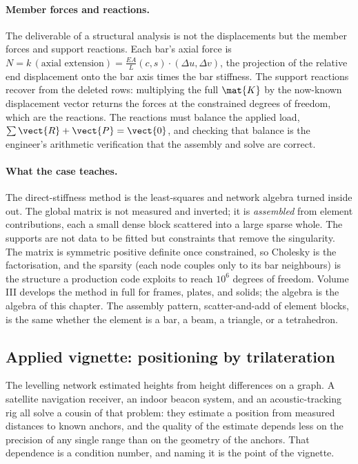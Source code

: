 \paragraph{Member forces and reactions.}
The deliverable of a structural analysis is not the displacements but
the member forces and support reactions. Each bar's axial force is
$N = k\,(\text{axial extension}) = \tfrac{EA}{L}(c, s) \cdot
(\Delta u, \Delta v)$, the projection of the relative end displacement
onto the bar axis times the bar stiffness. The support reactions
recover from the deleted rows: multiplying the full $\mat{K}$ by the
now-known displacement vector returns the forces at the constrained
degrees of freedom, which are the reactions. The reactions must
balance the applied load, $\sum \vect{R} + \vect{P} = \vect{0}$, and
checking that balance is the engineer's arithmetic verification that
the assembly and solve are correct.

\paragraph{What the case teaches.}
The direct-stiffness method is the least-squares and network algebra
turned inside out. The global matrix is not measured and inverted; it
is \emph{assembled} from element contributions, each a small dense
block scattered into a large sparse whole. The supports are not data
to be fitted but constraints that remove the singularity. The matrix
is symmetric positive definite once constrained, so Cholesky is the
factorisation, and the sparsity (each node couples only to its bar
neighbours) is the structure a production code exploits to reach
$10^{6}$ degrees of freedom. Volume III develops the method in full
for frames, plates, and solids; the algebra is the algebra of this
chapter. The assembly pattern, scatter-and-add of element blocks, is
the same whether the element is a bar, a beam, a triangle, or a
tetrahedron.

\subsection{Applied vignette: positioning by trilateration}

The levelling network estimated heights from height differences on a
graph. A satellite navigation receiver, an indoor beacon system, and an
acoustic-tracking rig all solve a cousin of that problem: they estimate
a position from measured distances to known anchors, and the quality of
the estimate depends less on the precision of any single range than on
the geometry of the anchors. That dependence is a condition number, and
naming it is the point of the vignette.

